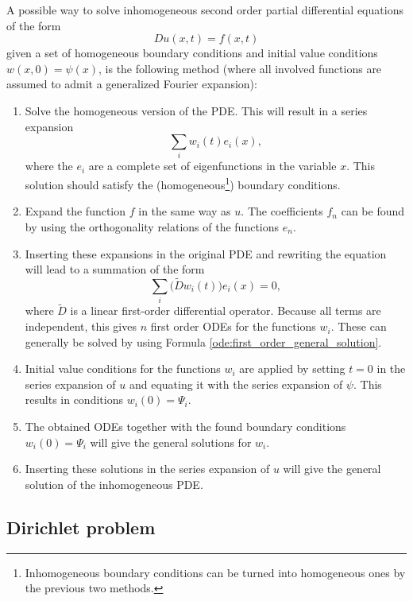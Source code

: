     \begin{method}
        A possible way to solve inhomogeneous second order partial differential equations of the form \[Du(x,t) = f(x,t)\] given a set of homogeneous boundary conditions and initial value conditions $w(x,0) = \psi(x)$, is the following method (where all involved functions are assumed to admit a generalized Fourier expansion):
        \begin{enumerate}
            \item Solve the homogeneous version of the PDE. This will result in a series expansion \[\sum_iw_i(t)e_i(x),\] where the $e_i$ are a complete set of eigenfunctions in the variable $x$. This solution should satisfy the (homogeneous\footnote{Inhomogeneous boundary conditions can be turned into homogeneous ones by the previous two methods.}) boundary conditions.
            \item Expand the function $f$ in the same way as $u$. The coefficients $f_n$ can be found by using the orthogonality relations of the functions $e_n$.
            \item Inserting these expansions in the original PDE and rewriting the equation will lead to a summation of the form
            \[\sum_i\big(\widetilde{D}w_i(t)\big)e_i(x) = 0,\] where $\widetilde{D}$ is a linear first-order differential operator. Because all terms are independent, this gives $n$ first order ODEs for the functions $w_i$. These can generally be solved by using Formula \ref{ode:first_order_general_solution}.
            \item Initial value conditions for the functions $w_i$ are applied by setting $t=0$ in the series expansion of $u$ and equating it with the series expansion of $\psi$. This results in conditions $w_i(0) = \Psi_i$.
            \item The obtained ODEs together with the found boundary conditions $w_i(0) = \Psi_i$ will give the general solutions for $w_i$.
            \item Inserting these solutions in the series expansion of $u$ will give the general solution of the inhomogeneous PDE.
        \end{enumerate}
    \end{method}

\subsection{Dirichlet problem}

